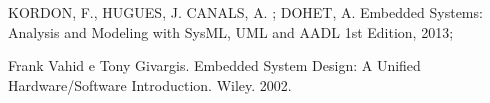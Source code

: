 {{    KORDON, F., HUGUES, J. CANALS, A. ; DOHET, A. Embedded Systems: Analysis and Modeling with SysML, UML and AADL 1st Edition, 2013;

    Frank Vahid e Tony Givargis. Embedded System Design: A Unified Hardware/Software Introduction. Wiley. 2002.}

}


